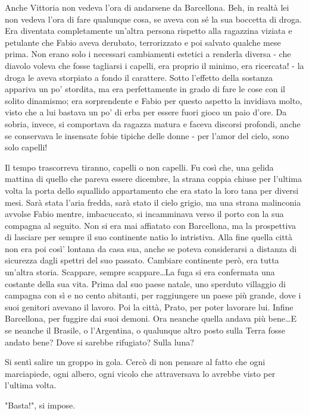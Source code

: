 Anche Vittoria non vedeva l'ora di andarsene da Barcellona. Beh, in realtà lei non vedeva l'ora di fare qualunque cosa, se aveva con sé la sua boccetta di droga. Era diventata completamente un'altra persona rispetto alla ragazzina viziata e petulante che Fabio aveva derubato, terrorizzato e poi salvato qualche mese prima. Non erano solo i necessari cambiamenti estetici a renderla diversa - che diavolo voleva che fosse tagliarsi i capelli, era proprio il minimo, era ricercata! - la droga le aveva storpiato a fondo il carattere. Sotto l'effetto della sostanza appariva un po' stordita, ma era perfettamente in grado di fare le cose con il solito dinamismo; era sorprendente e Fabio per questo aspetto la invidiava molto, visto che a lui bastava un po' di erba per essere fuori gioco un paio d'ore. Da sobria, invece, si comportava da ragazza matura e faceva discorsi profondi, anche se conservava le insensate fobie tipiche delle donne - per l'amor del cielo, sono solo capelli!

Il tempo trascorreva tiranno, capelli o non capelli. Fu così che, una gelida mattina di quello che pareva essere dicembre, la strana coppia chiuse per l'ultima volta la porta dello squallido appartamento che era stato la loro tana per diversi mesi. Sarà stata l'aria fredda, sarà stato il cielo grigio, ma una strana malinconia avvolse Fabio mentre, imbacuccato, si incamminava verso il porto con la sua compagna al seguito. Non si era mai affiatato con Barcellona, ma la prospettiva di lasciare per sempre il suo continente natio lo intristiva. Alla fine quella città non era poi così' lontana da casa sua, anche se poteva considerarsi a distanza di sicurezza dagli spettri del suo passato. Cambiare continente però, era tutta un'altra storia. Scappare, sempre scappare\ldots La fuga si era confermata una costante della sua vita. Prima dal suo paese natale, uno sperduto villaggio di campagna con sì e no cento abitanti, per raggiungere un paese più grande, dove i suoi genitori avevano il lavoro. Poi la città, Prato, per poter lavorare lui. Infine Barcellona, per fuggire dai suoi demoni. Ora neanche quella andava più bene\ldots E se neanche il Brasile, o l'Argentina, o qualunque altro posto sulla Terra fosse andato bene? Dove si sarebbe rifugiato? Sulla luna?

Si sentì salire un groppo in gola. Cercò di non pensare al fatto che ogni marciapiede, ogni albero, ogni vicolo che attraversava lo avrebbe visto per l'ultima volta.

"Basta!", si impose.

